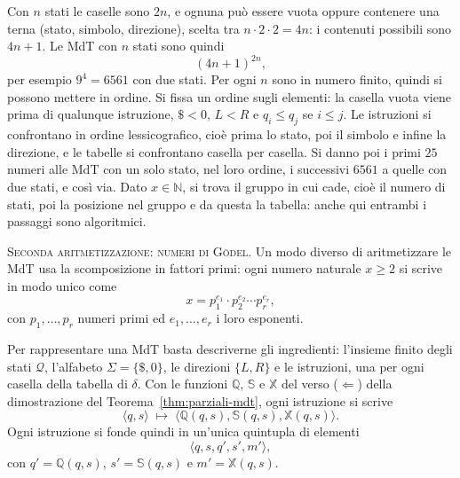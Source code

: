 \documentclass[a4paper, 11pt, oneside]{book}
\theoremstyle{formale}
\begin{document}
    Con $n$ stati le caselle sono $2n$, e ognuna pu\`o essere vuota oppure contenere una
    terna (stato, simbolo, direzione), scelta tra $n \cdot 2 \cdot 2 = 4n$: i contenuti
    possibili sono $4n + 1$. Le MdT con $n$ stati sono quindi
    \begin{equation*}
        (4n + 1)^{2n},
    \end{equation*}
    per esempio $9^4 = 6561$ con due stati. Per ogni $n$ sono in numero finito, quindi si
    possono mettere in ordine. Si fissa un ordine sugli elementi: la casella vuota viene
    prima di qualunque istruzione, $\$ < 0$, $L < R$ e $q_i \le q_j$ se $i \le j$. Le
    istruzioni si confrontano in ordine lessicografico, cio\`e prima lo stato, poi il
    simbolo e infine la direzione, e le tabelle si confrontano casella per casella. Si
    danno poi i primi $25$ numeri alle MdT con un solo stato, nel loro ordine, i
    successivi $6561$ a quelle con due stati, e cos\`i via. Dato $x \in \mathbb{N}$, si
    trova il gruppo in cui cade, cio\`e il numero di stati, poi la posizione nel gruppo e
    da questa la tabella: anche qui entrambi i passaggi sono algoritmici.

    \medskip
    \textsc{Seconda aritmetizzazione: numeri di G\"odel}. Un modo diverso di
    aritmetizzare le MdT usa la scomposizione in fattori primi: ogni numero naturale
    $x \ge 2$ si scrive in modo unico come
    \begin{equation*}
        x = p_1^{e_1} \cdot p_2^{e_2} \cdots p_r^{e_r},
    \end{equation*}
    con $p_1, \dots, p_r$ numeri primi ed $e_1, \dots, e_r$ i loro esponenti.

    Per rappresentare una MdT basta descriverne gli ingredienti: l'insieme finito degli
    stati $\mathcal{Q}$, l'alfabeto $\Sigma = \{\$, 0\}$, le direzioni $\{L, R\}$ e le
    istruzioni, una per ogni casella della tabella di $\delta$. Con le funzioni
    $\mathbb{Q}$, $\mathbb{S}$ e $\mathbb{X}$ del verso ($\Leftarrow$) della dimostrazione
    del Teorema~\ref{thm:parziali-mdt}, ogni istruzione si scrive
    \begin{equation*}
        \langle q, s \rangle \;\longmapsto\;
        \langle \mathbb{Q}(q, s), \mathbb{S}(q, s), \mathbb{X}(q, s) \rangle.
    \end{equation*}
    Ogni istruzione si fonde quindi in un'unica quintupla di elementi
    \begin{equation*}
        \langle q, s, q', s', m' \rangle,
    \end{equation*}
    con $q' = \mathbb{Q}(q, s)$, $s' = \mathbb{S}(q, s)$ e $m' = \mathbb{X}(q, s)$.
\end{document}
